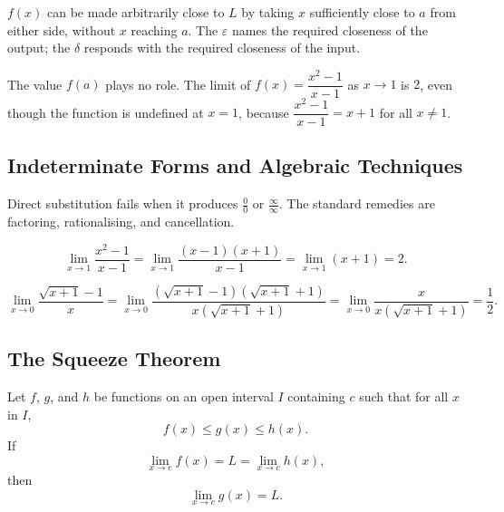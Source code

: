 \begin{remark*}[Intuition]
$f(x)$ can be made arbitrarily close to $L$ by taking $x$
sufficiently close to $a$ from either side, without $x$ reaching $a$.
The $\varepsilon$ names the required closeness of the output;
the $\delta$ responds with the required closeness of the input.
\end{remark*}

\begin{remark*}
The value $f(a)$ plays no role. The limit of $f(x) = \dfrac{x^2 - 1}{x - 1}$
as $x \to 1$ is $2$, even though the function is undefined at $x = 1$,
because $\dfrac{x^2-1}{x-1} = x + 1$ for all $x \neq 1$.
\end{remark*}


\subsection{Indeterminate Forms and Algebraic Techniques}

Direct substitution fails when it produces $\tfrac{0}{0}$ or
$\tfrac{\infty}{\infty}$. The standard remedies are factoring,
rationalising, and cancellation.

\begin{tcolorbox}[colback=gray!6, colframe=gray!40, arc=2pt,
  left=6pt, right=6pt, top=4pt, bottom=4pt,
  title={\small\textbf{Example: Factoring}},
  fonttitle=\small\bfseries]
\[
  \lim_{x \to 1} \frac{x^2 - 1}{x - 1}
  = \lim_{x \to 1} \frac{(x-1)(x+1)}{x-1}
  = \lim_{x \to 1} (x + 1)
  = 2.
\]
\end{tcolorbox}

\begin{tcolorbox}[colback=gray!6, colframe=gray!40, arc=2pt,
  left=6pt, right=6pt, top=4pt, bottom=4pt,
  title={\small\textbf{Example: Rationalising}},
  fonttitle=\small\bfseries]
\[
  \lim_{x \to 0} \frac{\sqrt{x+1} - 1}{x}
  = \lim_{x \to 0} \frac{(\sqrt{x+1} - 1)(\sqrt{x+1} + 1)}{x(\sqrt{x+1}+1)}
  = \lim_{x \to 0} \frac{x}{x(\sqrt{x+1}+1)}
  = \frac{1}{2}.
\]
\end{tcolorbox}


\subsection{The Squeeze Theorem}

\begin{tcolorbox}[colback=thmbox, colframe=thmborder, arc=2pt,
  left=6pt, right=6pt, top=4pt, bottom=4pt,
  title={\small\textbf{Theorem (Squeeze Theorem)}},
  fonttitle=\small\bfseries]
Let $f$, $g$, and $h$ be functions on an open interval $I$
containing $c$ such that for all $x$ in $I$,
\[
  f(x) \leq g(x) \leq h(x).
\]
If
\[
  \lim_{x \to c} f(x) = L = \lim_{x \to c} h(x),
\]
then
\[
  \lim_{x \to c} g(x) = L.
\]
\end{tcolorbox}


